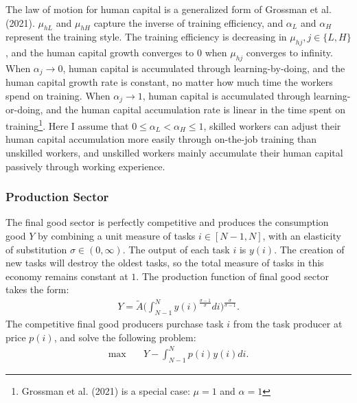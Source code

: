 \documentclass[12pt]{article}
\begin{document}
The law of motion for human capital is a generalized form of Grossman et al. (2021)\nocite{Grossmanetal2021}. $\mu_{hL}$ and $\mu_{hH}$ capture the inverse of training efficiency, and $\alpha_L$ and $\alpha_H$ represent the training style. The training efficiency is decreasing in $\mu_{hj}, j\in\{L,H\}$, and the human capital growth converges to 0 when $\mu_{hj}$ converges to infinity. When $\alpha_j \to 0$, human capital is accumulated through learning-by-doing, and the human capital growth rate is constant, no matter how much time the workers spend on training. When $\alpha_j \to 1$, human capital is accumulated through learning-or-doing, and the human capital accumulation rate is linear in the time spent on training\footnote{Grossman et al. (2021) is a special case: $\mu = 1$ and $\alpha=1$}. Here I assume that $0\leq\alpha_L<\alpha_H\leq1$, skilled workers can adjust their human capital accumulation more easily through on-the-job training than unskilled workers, and unskilled workers mainly accumulate their human capital passively through working experience. 

\subsubsection*{Production Sector}

The final good sector is perfectly competitive and produces the consumption good $Y$ by combining a unit measure of tasks $i\in [N-1,N]$, with an elasticity of substitution $\sigma \in (0,\infty)$. The output of each task $i$ is $y(i)$. The creation of new tasks will destroy the oldest tasks, so the total measure of tasks in this economy remains constant at $1$. The production function of final good sector takes the form:
\begin{align*}
Y = \tilde{A}\Big(\int_{N-1}^{N}y(i)^{\frac{\sigma-1}{\sigma}}di\Big)^{\frac{\sigma}{\sigma-1}}.
\end{align*}
The competitive final good producers purchase task $i$ from the task producer at price $p(i)$, and solve the following problem:
\begin{align*}
\max \quad & Y-\int_{N-1}^Np(i)y(i)di. 
\end{align*}
\end{document}
